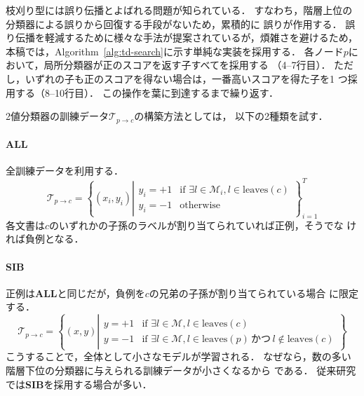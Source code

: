 \documentclass[japanese]{jnlp_1.4}
\begin{document}
枝刈り型には誤り伝播\cite{Bennett2009}とよばれる問題が知られている．
すなわち，階層上位の分類器による誤りから回復する手段がないため，累積的に
誤りが作用する．
誤り伝播を軽減するために様々な手法が提案されているが，煩雑さを避けるため，
本稿では，Algorithm~\ref{alg:td-search}に示す単純な実装を採用する．
各ノード$p$において，局所分類器が正のスコアを返す子すべてを採用する
（4--7行目）．
ただし，いずれの子も正のスコアを得ない場合は，一番高いスコアを得た子を1
つ採用する（8--10行目）．
この操作を葉に到達するまで繰り返す．



2値分類器の訓練データ$\mathcal{T}_{p \rightarrow c}$の構築方法としては，
以下の2種類を試す．
\paragraph{ALL} \hspace{1zw}
全訓練データを利用する\cite{Punera2008}．
\[
\mathcal{T}_{p \rightarrow c} = \left\{
 ( x_i, y_i ) \left|
\begin{array}{ll}
 y_i = +1 & \mbox{if $\exists l \in \mathcal{M}_i, l \in \mathrm{leaves}(c)$} \\
 y_i = -1 & \mbox{otherwise}
\end{array}
 \right. \right\}_{i=1}^T 
\]
各文書は$c$のいずれかの子孫のラベルが割り当てられていれば正例，そうでな
ければ負例となる．
\paragraph{SIB} \hspace{1zw}
正例は{\bf ALL}と同じだが，負例を$c$の兄弟の子孫が割り当てられている場合
に限定する．
\[
\mathcal{T}_{p \rightarrow c} = \left\{
 ( x, y ) \left|
\begin{array}{ll}
 y = +1 & \mbox{if $\exists l \in \mathcal{M}$}, l \in \mathrm{leaves}(c) \\
 y = -1 & \mbox{if $\exists l \in \mathcal{M}$},  l \in \mathrm{leaves}(p) 
   \, \mbox{かつ} \, l \notin \mathrm{leaves}(c) 
\end{array}
\right. \right\}
\]
こうすることで，全体として小さなモデルが学習される．
なぜなら，数の多い階層下位の分類器に与えられる訓練データが小さくなるから
である．
従来研究では{\bf SIB}を採用する場合が多い\cite{Liu2005,Wang2011IJCNLPfull,Sasaki2012}．
\end{document}
